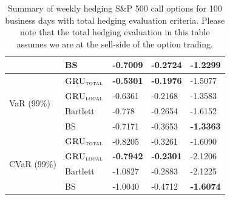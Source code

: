 \documentclass[letterpaper,12pt,titlepage,oneside,final]{book}
\numberwithin{equation}{section}
\theoremstyle{definition}
\newcommand{\modelT}{\textsc{GRU}_{\textsc{total}}}
\newcommand{\modelL}{\textsc{GRU}_{\textsc{local}}}
\begin{document}
\begin{table}[htp!]
\begin{tabular}{ll|l|l|l|}
		\multicolumn{1}{|l|}{}                                & BS       & -0.7009          & -0.2724          & -1.2299          \\ \hline
		\multicolumn{1}{|l|}{\multirow{4}{*}{VaR (99\%)}}     & $\modelT$    & \textbf{-0.5301} & \textbf{-0.1976} & -1.5077          \\  
		\multicolumn{1}{|l|}{}                                & $\modelL$    & -0.6361          & -0.2168          & -1.3583          \\  
		\multicolumn{1}{|l|}{}                                & Bartlett & -0.778           & -0.2654          & -1.6152          \\  
		\multicolumn{1}{|l|}{}                                & BS       & -0.7171          & -0.3653          & \textbf{-1.3363} \\ \hline
		\multicolumn{1}{|l|}{\multirow{4}{*}{CVaR (99\%)}}    & $\modelT$    & -0.8205          & -0.3261 & -1.6090          \\  
		\multicolumn{1}{|l|}{}                                & $\modelL$    & \textbf{-0.7942} & \textbf{-0.2301}          & -2.1206          \\  
		\multicolumn{1}{|l|}{}                                & Bartlett & -1.0827          & -0.2883          & -2.1225          \\  
		\multicolumn{1}{|l|}{}                                & BS       & -1.0040          & -0.4712          & \textbf{-1.6074} \\ \hline
	\end{tabular}
	\caption{Summary of weekly hedging S\&P 500 call options for 100 business days with total hedging evaluation criteria. Please note that the total hedging evaluation in this table assumes we are at the sell-side of the option trading.} \label{table:CallTotalW}
\end{table}
\end{document}
